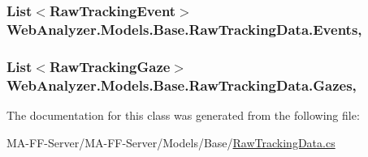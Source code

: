 \subsubsection[{Events}]{\setlength{\rightskip}{0pt plus 5cm}List$<${\bf Raw\+Tracking\+Event}$>$ Web\+Analyzer.\+Models.\+Base.\+Raw\+Tracking\+Data.\+Events\hspace{0.3cm}{\ttfamily [get]}, {\ttfamily [set]}}\label{class_web_analyzer_1_1_models_1_1_base_1_1_raw_tracking_data_a288234f675cdfe067ec0667aa2be36c3}
\hypertarget{class_web_analyzer_1_1_models_1_1_base_1_1_raw_tracking_data_a709969dfa88f800747d1bbabbdfb334e}{}
\subsubsection[{Gazes}]{\setlength{\rightskip}{0pt plus 5cm}List$<${\bf Raw\+Tracking\+Gaze}$>$ Web\+Analyzer.\+Models.\+Base.\+Raw\+Tracking\+Data.\+Gazes\hspace{0.3cm}{\ttfamily [get]}, {\ttfamily [set]}}\label{class_web_analyzer_1_1_models_1_1_base_1_1_raw_tracking_data_a709969dfa88f800747d1bbabbdfb334e}


The documentation for this class was generated from the following file\+:\begin{DoxyCompactItemize}
\item 
M\+A-\/\+F\+F-\/\+Server/\+M\+A-\/\+F\+F-\/\+Server/\+Models/\+Base/\hyperlink{_raw_tracking_data_8cs}{Raw\+Tracking\+Data.\+cs}\end{DoxyCompactItemize}

